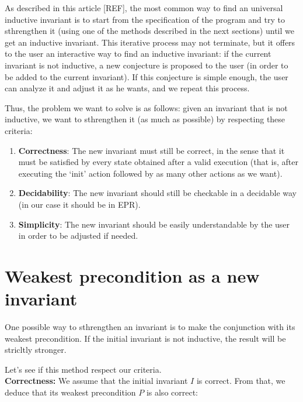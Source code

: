 \documentclass[11pt,a4paper,oldfontcommands,openany]{memoir}
\begin{document}
    As described in this article [REF], the most common way to find an universal inductive invariant is to start from the specification of the program
    and try to sthrengthen it (using one of the methods described in the next sections) until we get an inductive invariant.
    This iterative process may not terminate, but it offers to the user an interactive way to find an inductive invariant:
    if the current invariant is not inductive, a new conjecture is proposed to the user (in order to be added to the current invariant).
    If this conjecture is simple enough, the user can analyze it and adjust it as he wants, and we repeat this process.

    Thus, the problem we want to solve is as follows:
    given an invariant that is not inductive, we want to sthrengthen it (as much as possible) by respecting these criteria:
    \begin{enumerate}
        \item \textbf{Correctness}: The new invariant must still be correct, in the sense that it must be satisfied by every state obtained
        after a valid execution (that is, after executing the `init' action followed by as many other actions as we want).
        \item \textbf{Decidability}: The new invariant should still be checkable in a decidable way (in our case it should be in EPR).
        \item \textbf{Simplicity}: The new invariant should be easily understandable by the user in order to be adjusted if needed.
    \end{enumerate}

    \section{Weakest precondition as a new invariant}

    One possible way to sthrengthen an invariant is to make the conjunction with its weakest precondition.
    If the initial invariant is not inductive, the result will be stricltly stronger.

    Let's see if this method respect our criteria.\\
    
    \textbf{Correctness:} We assume that the initial invariant \(I\) is correct. From that, we deduce that its weakest precondition \(P\) is also correct:
    \\
\end{document}
